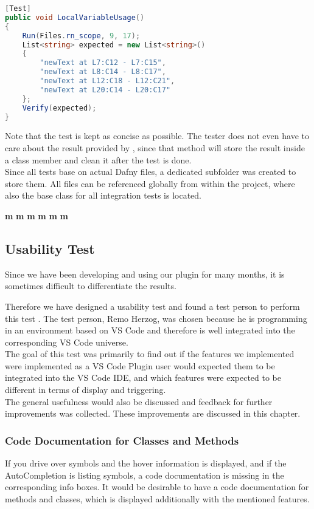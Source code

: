 \begin{lstlisting}[language=csharp, caption={Sample Integration Test}, captionpos=b, label={lst:sampleintegrationtest}]
[Test]
public void LocalVariableUsage()
{
    Run(Files.rn_scope, 9, 17);
    List<string> expected = new List<string>()
    {
        "newText at L7:C12 - L7:C15",
        "newText at L8:C14 - L8:C17",
        "newText at L12:C18 - L12:C21",
        "newText at L20:C14 - L20:C17"
    };
    Verify(expected);
}
\end{lstlisting}

Note that the test is kept as concise as possible.
The tester does not even have to care about the result provided by , since that method will store the result inside a class member and clean it after the test is done.\\

Since all tests base on actual Dafny files, a dedicated subfolder was created to store them.
All files can be referenced globally from within the  project, where also the base class for all integration tests is located.



\textbf{m}
\textbf{m}
\textbf{m}
\textbf{m}
\textbf{m}
\textbf{m}


\subsection{Usability Test}
Since we have been developing and using our plugin for many months,
it is sometimes difficult to differentiate the results.

Therefore we have designed a usability test and found a test person to perform this test \cite{interview-remo}.
The test person, Remo Herzog, was chosen because he is programming in an environment based on VS Code
and therefore is well integrated into the corresponding VS Code universe. \\

The goal of this test was primarily to find out if the features
we implemented were implemented as a VS Code Plugin user would expected them to be integrated into the VS Code IDE,
and which features were expected to be different in terms of display and triggering. \\

The general usefulness would also be discussed and feedback for further improvements was collected.
These improvements are discussed in this chapter.

\subsubsection{Code Documentation for Classes and Methods}
If you drive over symbols and the hover information is displayed,
and if the AutoCompletion is listing symbols,
a code documentation is missing in the corresponding info boxes.
It would be desirable to have a code documentation for methods and classes,
which is displayed additionally with the mentioned features. \\


